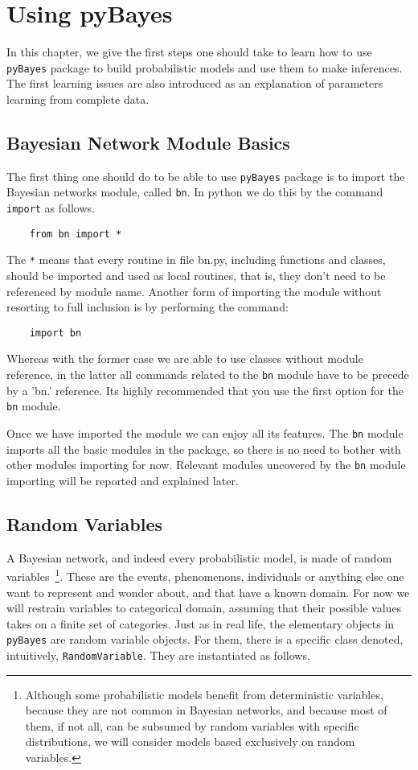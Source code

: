 \documentclass[10pt,a4paper]{report}
\begin{document}
\chapter{Using pyBayes}
In this chapter, we give the first steps one should take to learn how to use \verb|pyBayes| package to build probabilistic models and use them to make inferences. The first learning issues are also introduced as an explanation of parameters learning from complete data.

\section{Bayesian Network Module Basics}
\label{sec:basics}
The first thing one should do to be able to use \verb|pyBayes| package is to import the Bayesian networks module, called \verb|bn|. In python we do this by the command \verb|import| as follows.

\begin{verbatim}
	from bn import *
\end{verbatim}

The \verb|*| means that every routine in file bn.py, including functions and classes, should be imported and used as local routines, that is, they don't need to be referenced by module name. Another form of importing the module without resorting to full inclusion is by performing the command:

\begin{verbatim}
	import bn
\end{verbatim}

Whereas with the former case we are able to use classes without module reference, in the latter all commands related to the \verb|bn| module have to be precede by a 'bn.' reference. Its highly recommended that you use the first option for the \verb|bn| module.

Once we have imported the module we can enjoy all its features. The \verb|bn| module imports all the basic modules in the package, so there is no need to bother with other modules importing for now. Relevant modules uncovered by the \verb|bn| module importing will be reported and explained later.

\section{Random Variables}
\label{sec:randomvariables}
A Bayesian network, and indeed every probabilistic model, is made of random variables~\footnote{Although some probabilistic models benefit from deterministic variables, because they are not common in Bayesian networks, and because most of them, if not all, can be subsumed by random variables with specific distributions, we will consider models based exclusively on random variables.}. These are the events, phenomenons, individuals or anything else one want to represent and wonder about, and that have a known domain. For now we will restrain variables to categorical domain, assuming that their possible values takes on a finite set of categories. Just as in real life, the elementary objects in \verb|pyBayes| are random variable objects. For them, there is a specific class denoted, intuitively, \verb|RandomVariable|. They are instantiated as follows.
\end{document}
